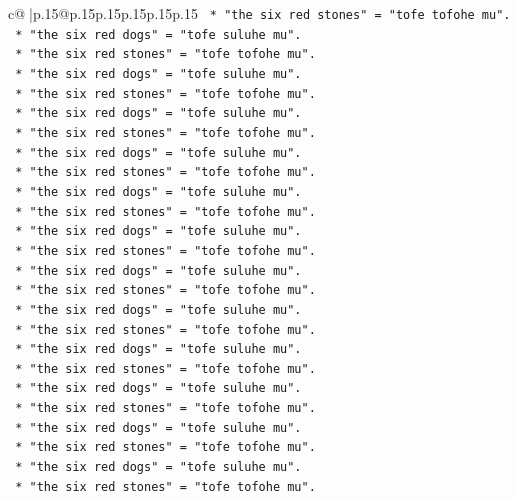 \documentclass{article}
\begin{document}
{\begin{supertabular}{c@{$\;$}|p{.15\linewidth}@{}p{.15\linewidth}p{.15\linewidth}p{.15\linewidth}p{.15\linewidth}p{.15\linewidth}}
{{{\texttt{        *   "the six red stones" = "tofe tofohe mu".} \\
\texttt{        *   "the six red dogs" = "tofe suluhe mu".} \\
\texttt{        *   "the six red stones" = "tofe tofohe mu".} \\
\texttt{        *   "the six red dogs" = "tofe suluhe mu".} \\
\texttt{        *   "the six red stones" = "tofe tofohe mu".} \\
\texttt{        *   "the six red dogs" = "tofe suluhe mu".} \\
\texttt{        *   "the six red stones" = "tofe tofohe mu".} \\
\texttt{        *   "the six red dogs" = "tofe suluhe mu".} \\
\texttt{        *   "the six red stones" = "tofe tofohe mu".} \\
\texttt{        *   "the six red dogs" = "tofe suluhe mu".} \\
\texttt{        *   "the six red stones" = "tofe tofohe mu".} \\
\texttt{        *   "the six red dogs" = "tofe suluhe mu".} \\
\texttt{        *   "the six red stones" = "tofe tofohe mu".} \\
\texttt{        *   "the six red dogs" = "tofe suluhe mu".} \\
\texttt{        *   "the six red stones" = "tofe tofohe mu".} \\
\texttt{        *   "the six red dogs" = "tofe suluhe mu".} \\
\texttt{        *   "the six red stones" = "tofe tofohe mu".} \\
\texttt{        *   "the six red dogs" = "tofe suluhe mu".} \\
\texttt{        *   "the six red stones" = "tofe tofohe mu".} \\
\texttt{        *   "the six red dogs" = "tofe suluhe mu".} \\
\texttt{        *   "the six red stones" = "tofe tofohe mu".} \\
\texttt{        *   "the six red dogs" = "tofe suluhe mu".} \\
\texttt{        *   "the six red stones" = "tofe tofohe mu".} \\
\texttt{        *   "the six red dogs" = "tofe suluhe mu".} \\
\texttt{        *   "the six red stones" = "tofe tofohe mu".} \\
}}}
\end{supertabular}}
\end{document}
